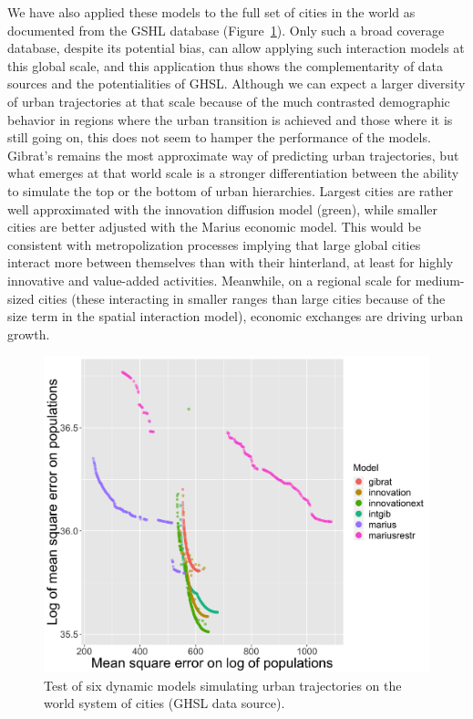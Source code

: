 \documentclass[11pt]{article}
\begin{document}
We have also applied these models to the full set of cities in the world as documented from the GSHL database (Figure~\ref{fig:fig9}). Only such a broad coverage database, despite its potential bias, can allow applying such interaction models at this global scale, and this application thus shows the complementarity of data sources and the potentialities of GHSL. Although we can expect a larger diversity of urban trajectories at that scale because of the much contrasted demographic behavior in regions where the urban transition is achieved and those where it is still going on, this does not seem to hamper the performance of the models. Gibrat's remains the most approximate way of predicting urban trajectories, but what emerges at that world scale is a stronger differentiation between the ability to simulate the top or the bottom of urban hierarchies. Largest cities are rather well approximated with the innovation diffusion model (green), while smaller cities are better adjusted with the Marius economic model. This would be consistent with metropolization processes implying that large global cities interact more between themselves than with their hinterland, at least for highly innovative and value-added activities. Meanwhile, on a regional scale for medium-sized cities (these interacting in smaller ranges than large cities because of the size term in the spatial interaction model), economic exchanges are driving urban growth. 

\begin{figure}
\centering
\includegraphics[width=\textwidth]{Fig9.png}
\caption{Test of six dynamic models simulating urban trajectories on the world system of cities (GHSL data source).\label{fig:fig9}}
\end{figure}   
\end{document}
